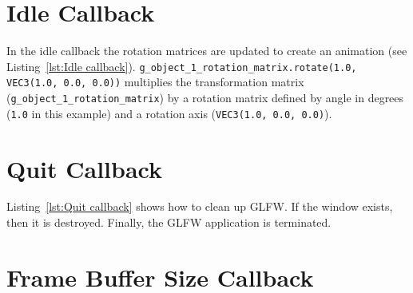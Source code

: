 \documentclass[11pt,oneside,a4paper,final]{article}
\begin{document}
\begin{center}

\end{center}


\section{Idle Callback}
\label{sec:Idle Callback}

In the idle callback the rotation matrices are updated to create an animation 
(see Listing~\ref{lst:Idle callback}). 
\verb+g_object_1_rotation_matrix.rotate(1.0, VEC3(1.0, 0.0, 0.0))+ multiplies 
the transformation matrix (\verb+g_object_1_rotation_matrix+) by a rotation 
matrix defined by angle in degrees (\verb+1.0+ in this example) and a rotation 
axis (\verb+VEC3(1.0, 0.0, 0.0)+).

\begin{center}

\end{center}

	
\section{Quit Callback}
\label{sec:Quit Callback}

Listing~\ref{lst:Quit callback} shows how to clean up GLFW. 
If the window exists, then it is destroyed. 
Finally, the GLFW application is terminated. 

\begin{center}

\end{center}


\section{Frame Buffer Size Callback}
\label{sec:frame buffer callback}
\end{document}
